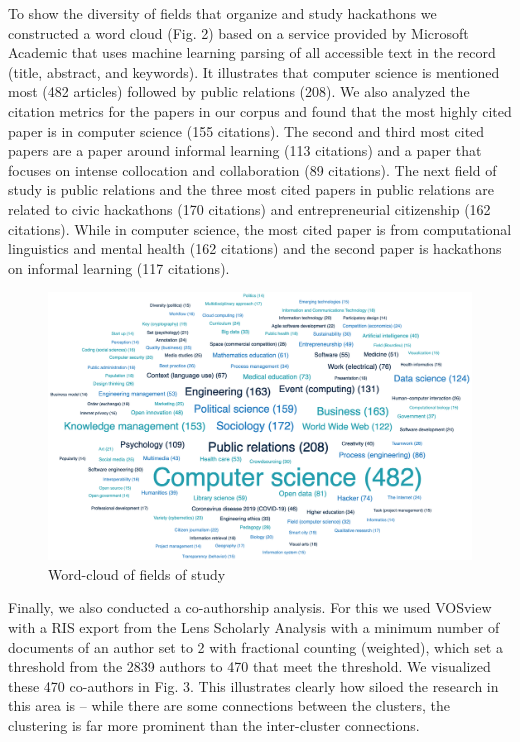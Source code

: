 \documentclass{ieeeaccess}
\begin{document}
To show the diversity of fields that organize and study hackathons we constructed a word cloud (Fig. 2) %
based on a service provided by Microsoft Academic that uses machine learning parsing of all accessible text in the record (title, abstract, and keywords). 
It illustrates that computer science is mentioned most (482 articles) followed by public relations (208). 
We also analyzed the citation metrics for the papers in our corpus and found that the most highly cited paper is in computer science (155 citations). 
The second and third most cited papers are a paper around informal learning (113 citations) and a paper that focuses on intense collocation and collaboration (89 citations). 
The next field of study is public relations and the three most cited papers in public relations are related to civic hackathons (170 citations) and entrepreneurial citizenship (162 citations). 
While in computer science, the most cited paper is from computational linguistics and mental health (162 citations) and the second paper is hackathons on informal learning (117 citations).


\begin{figure}
\centering
\includegraphics[width=\linewidth]{wordcloud.png}
\caption{Word-cloud of fields of study}
\label{fig:wordcloud}
\vspace{-10pt}
\end{figure}

Finally, we also conducted a co-authorship analysis. 
For this we used VOSview~\cite{van2010software} with a RIS export from the Lens Scholarly Analysis with a minimum number of documents of an author set to 2 with fractional counting (weighted), which set a threshold from the 2839 authors to 470 that meet the threshold. 
We visualized these 470 co-authors in Fig. 3.
This illustrates clearly how siloed the research in this area is -- while there are some connections between the clusters, the clustering is far more prominent than the inter-cluster connections.
\end{document}
